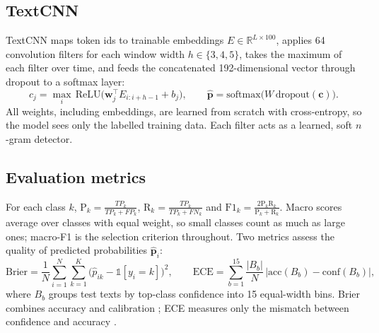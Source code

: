 \subsection{TextCNN}
TextCNN \cite{kim2014} maps token ids to trainable embeddings $E\in\mathbb{R}^{L\times 100}$, applies 64 convolution filters for each window width $h\in\{3,4,5\}$, takes the maximum of each filter over time, and feeds the concatenated 192-dimensional vector through dropout to a softmax layer:
\[
c_{j} = \max_{i}\,\mathrm{ReLU}\bigl(\mathbf{w}_j^{\top}E_{i:i+h-1}+b_j\bigr),\qquad \hat{\mathbf{p}}=\mathrm{softmax}\bigl(W\,\mathrm{dropout}(\mathbf{c})\bigr).
\]
All weights, including embeddings, are learned from scratch with cross-entropy, so the model sees only the labelled training data. Each filter acts as a learned, soft $n$-gram detector.

\subsection{Evaluation metrics}
\label{sec:metrics}
For each class $k$, $\mathrm{P}_k=\frac{TP_k}{TP_k+FP_k}$, $\mathrm{R}_k=\frac{TP_k}{TP_k+FN_k}$ and $\mathrm{F1}_k=\frac{2\mathrm{P}_k\mathrm{R}_k}{\mathrm{P}_k+\mathrm{R}_k}$. Macro scores average over classes with equal weight, so small classes count as much as large ones; macro-F1 is the selection criterion throughout. Two metrics assess the quality of predicted probabilities $\hat{\mathbf{p}}_i$:
\[
\mathrm{Brier}=\frac{1}{N}\sum_{i=1}^{N}\sum_{k=1}^{K}\bigl(\hat p_{ik}-\mathbb{1}[y_i=k]\bigr)^2,\qquad
\mathrm{ECE}=\sum_{b=1}^{15}\frac{|B_b|}{N}\,\bigl|\mathrm{acc}(B_b)-\mathrm{conf}(B_b)\bigr|,
\]
where $B_b$ groups test texts by top-class confidence into 15 equal-width bins. Brier combines accuracy and calibration \cite{brier1950}; ECE measures only the mismatch between confidence and accuracy \cite{guo2017}.

